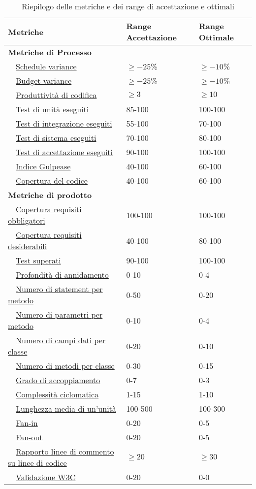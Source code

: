 	\begin{table}[H]
	\begin{tabular}{|l|l|l|}
	\hline
	\textbf{Metriche} 						&\textbf{Range Accettazione} &\textbf{Range Ottimale} \\
	\hline
	\multicolumn{3}{|l|}{\textbf{Metriche di Processo}}\\%
	\hline
	~~\hyperlink{sv}{Schedule variance} 							&$\geq{-25}$\%	&$\geq{-10}$\%\\
	~~\hyperlink{bv}{Budget variance} 								&$\geq{-25}$\%	&$\geq{-10}$\%\\
	~~\hyperlink{pc}{Produttività di codifica} 						&$\geq{3}$		&$\geq{10}$\\
	~~\hyperlink{tue}{Test di unità eseguiti}						&85-100			&100-100\\
	~~\hyperlink{tie}{Test di integrazione eseguiti}					&55-100			&70-100\\
	~~\hyperlink{tse}{Test di sistema eseguiti}						&70-100			&80-100\\
	~~\hyperlink{tae}{Test di accettazione eseguiti}					&90-100			&100-100\\
	~~\hyperlink{ig}{Indice Gulpease}								&40-100			&60-100\\
	~~\hyperlink{cco}{Copertura del codice}							&40-100			&60-100\\
	\hline
	\multicolumn{3}{|l|}{\textbf{Metriche di prodotto}}\\%
	\hline
	~~\hyperlink{cro}{Copertura requisiti obbligatori}				&100-100		&100-100\\
	~~\hyperlink{crd}{Copertura requisiti desiderabili}				&40-100			&80-100\\
	~~\hyperlink{ts}{Test superati}									&90-100			&100-100\\
	~~\hyperlink{pa}{Profondità di annidamento}						&0-10			&0-4\\
	~~\hyperlink{nsm}{Numero di statement per metodo}				&0-50			&0-20\\
	~~\hyperlink{npm}{Numero di parametri per metodo}				&0-10			&0-4\\
	~~\hyperlink{ncdc}{Numero di campi dati per classe}				&0-20			&0-10\\
	~~\hyperlink{nmc}{Numero di metodi per classe}					&0-30			&0-15\\
	~~\hyperlink{ga}{Grado di accoppiamento}						&0-7			&0-3\\
	~~\hyperlink{cci}{Complessità ciclomatica}						&1-15			&1-10\\
	~~\hyperlink{lmu}{Lunghezza media di un'unità}					&100-500		&100-300\\
	~~\hyperlink{fi}{Fan-in}										&0-20			&0-5\\
	~~\hyperlink{fo}{Fan-out}										&0-20			&0-5\\
	~~\hyperlink{rlclc}{Rapporto linee di commento su linee di codice}	&$\geq{20}$		&$\geq{30}$\\
	~~\hyperlink{vw}{Validazione W3C}								&0-20			&0-0\\
	\hline
	\end{tabular}
	\caption{Riepilogo delle metriche e dei range di accettazione e ottimali}
	\end{table}
	
